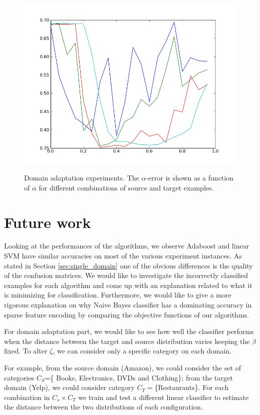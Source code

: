 \documentclass[letterpaper]{article}
\begin{document}
\begin{figure}
  \subfigure%
  {\includegraphics[scale=.3]{adaptation_err_1_T}}
  \caption{Domain adaptation experiments. The $\alpha$-error is shown as a function of $\alpha$ for different combinations of source and target examples.}
  \label{fig:domain-adaptation}
\end{figure}

\section{Future work}
\label{sec:future-work}

Looking at the performances of the algorithms, we observe Adaboost and
linear SVM have similar accuracies on most of the various experiment
instances. As stated in Section \ref{sec:single_domain} one of the
obvious differences is the quality of the confusion matrices. We would
like to investigate the incorrectly classified examples for each
algorithm and come up with an explanation related to what it is
minimizing for classification.  Furthermore, we would like to give a
more rigorous explanation on why Naive Bayes classifier has a
dominating accuracy in sparse feature encoding by comparing the
objective functions of our algorithms.

For domain adaptation part, we would like to see how well the
classifier performs when the distance between the target and source
distribution varies keeping the $\beta$ fixed. To alter $\zeta$, we
can consider only a specific category on each domain.

For example, from the source domain (Amazon), we could consider the
set of categories $C_S$=\{ Books, Electronics, DVDs and Clothing\};
from the target domain (Yelp), we could consider category
$C_T=$\{Restaurants\}. For each combination in $C_s\times C_T$ we
train and test a different linear classifier to estimate the distance
between the two distributions of each configuration.
\end{document}

